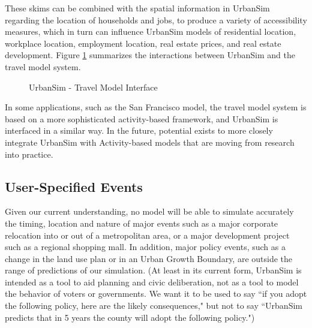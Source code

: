 These skims can be combined with the spatial information in UrbanSim regarding the location of households and jobs, to produce
a variety of accessibility measures, which in turn can influence UrbanSim models of residential location, workplace location, employment
location, real estate prices, and real estate development.  Figure \ref{fig:TMinterface} summarizes the interactions between UrbanSim and
the travel model system.

\begin{figure}[ht]
\center {}
\caption{UrbanSim - Travel Model Interface} \label{fig:TMinterface}
\end{figure}

In some applications, such as the San Francisco model, the travel model system is based on a more sophisticated activity-based
framework, and UrbanSim is interfaced in a similar way. In the future, potential exists to more closely integrate UrbanSim with
Activity-based models that are moving from research into practice.

\subsection{User-Specified Events}

Given our current understanding, no model will be able to simulate
accurately the timing, location and nature of major events such as
a major corporate relocation into or out of a metropolitan area,
or a major development project such as a regional shopping mall.
In addition, major policy events, such as a change in the land use
plan or in an Urban Growth Boundary, are outside the range of
predictions of our simulation.  (At least in its current form,
UrbanSim is intended as a tool to aid planning and civic
deliberation, not as a tool to model the behavior of voters or
governments.  We want it to be used to say ``if you adopt the
following policy, here are the likely consequences," but not to
say ``UrbanSim predicts that in 5 years the county will adopt the
following policy.")

